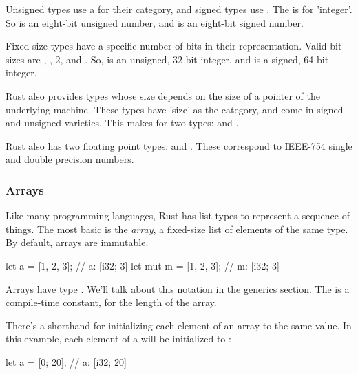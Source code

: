 \blank

Unsigned types use a  for their category, and signed types use . The  is for 'integer'. So  is an 
eight-bit unsigned number, and  is an eight-bit signed number.


Fixed size types have a specific number of bits in their representation. Valid bit sizes are , , 2, and .
So,  is an unsigned, 32-bit integer, and  is a signed, 64-bit integer.


Rust also provides types whose size depends on the size of a pointer of the underlying machine. These types have 'size' as the category,
and come in signed and unsigned varieties. This makes for two types:  and .


Rust also has two floating point types:  and . These correspond to IEEE-754 single and double precision numbers.

\subsubsection*{Arrays}

Like many programming languages, Rust has list types to represent a sequence of things. The most basic is the \emph{array}, a 
fixed-size list of elements of the same type. By default, arrays are immutable.

\begin{rustc}
let a = [1, 2, 3]; // a: [i32; 3]
let mut m = [1, 2, 3]; // m: [i32; 3]
\end{rustc}

Arrays have type \code{[T; N]}. We'll talk about this  notation in the generics section. The  is a compile-time 
constant, for the length of the array.

\blank

There's a shorthand for initializing each element of an array to the same value. In this example, each element of a will be initialized 
to :

\begin{rustc}
let a = [0; 20]; // a: [i32; 20]
\end{rustc}

